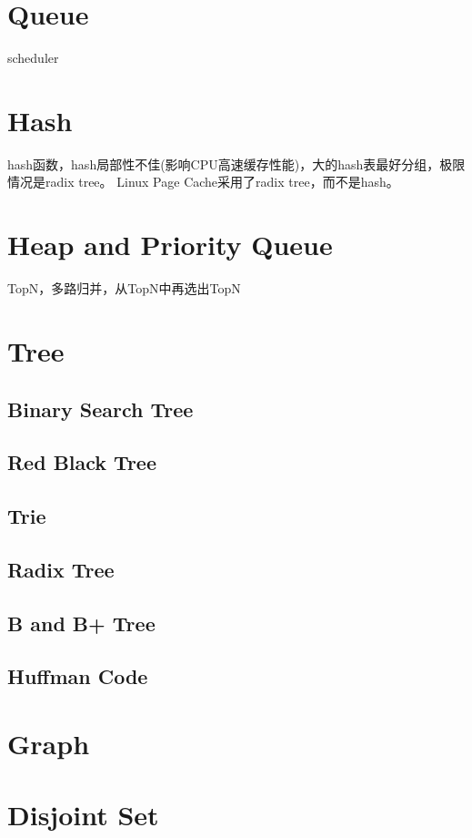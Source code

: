 \section{Queue}

scheduler

\section{Hash}

hash函数，hash局部性不佳(影响CPU高速缓存性能)，大的hash表最好分组，极限情况是radix tree。
Linux Page Cache采用了radix tree，而不是hash。

\section{Heap and Priority Queue}

TopN，多路归并，从TopN中再选出TopN

\section{Tree}

\subsection{Binary Search Tree}

\subsection{Red Black Tree}

\subsection{Trie}

\subsection{Radix Tree}

\subsection{B and B+ Tree}

\subsection{Huffman Code}

\section{Graph}

\section{Disjoint Set}
